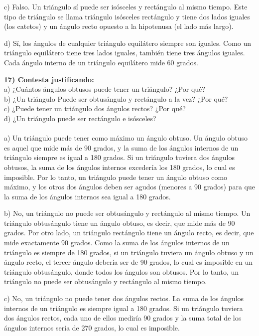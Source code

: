 \documentclass{article}
\begin{document}
c) Falso. Un triángulo sí puede ser isósceles y rectángulo al mismo tiempo. Este tipo de triángulo se llama triángulo isósceles rectángulo y tiene dos lados iguales (los catetos) y un ángulo recto opuesto a la hipotenusa (el lado más largo).

d) Sí, los ángulos de cualquier triángulo equilátero siempre
son iguales. Como un triángulo equilátero tiene tres lados iguales, también tiene tres ángulos iguales. Cada ángulo interno de un triángulo equilátero mide 60 grados.

{\bf 17) Contesta justificando: }\\
a) ¿Cuántos ángulos obtusos puede tener un triángulo? ¿Por qué?\\
b) ¿Un triángulo Puede ser obtusángulo y rectángulo a la vez? ¿Por qué?\\
c) ¿Puede tener un triángulo dos ángulos rectos? ¿Por qué?\\
d) ¿Un triángulo puede ser rectángulo e isósceles?\\
\\
a) Un triángulo puede tener como máximo un ángulo obtuso. Un
ángulo obtuso es aquel que mide más de 90 grados, y la suma de los ángulos internos de un triángulo siempre es igual a 180 grados. Si un triángulo tuviera dos ángulos obtusos, la suma de los ángulos internos excedería los 180 grados, lo cual es imposible. Por lo tanto, un triángulo puede tener un ángulo obtuso como máximo, y los otros dos ángulos deben ser agudos (menores a 90 grados) para que la suma de los ángulos internos sea igual a 180 grados.

b) No, un triángulo no puede ser obtusángulo y rectángulo al mismo tiempo. Un triángulo obtusángulo tiene un ángulo obtuso, es decir, que mide más de 90 grados. Por otro lado, un triángulo rectángulo tiene un ángulo recto, es decir, que mide exactamente 90 grados. Como la suma de los ángulos internos de un triángulo es siempre de 180 grados, si un triángulo tuviera un ángulo obtuso y un ángulo recto, el tercer ángulo debería ser de 90 grados, lo cual es imposible en un triángulo obtusángulo, donde todos los ángulos son obtusos. Por lo tanto, un triángulo no puede ser obtusángulo y rectángulo al mismo tiempo.

c) No, un triángulo no puede tener dos ángulos rectos. La suma de los ángulos internos de un triángulo es siempre igual a 180 grados. Si un triángulo tuviera dos ángulos rectos, cada uno de ellos mediría 90 grados y la suma total de los ángulos internos sería de 270 grados, lo cual es imposible.
\end{document}
